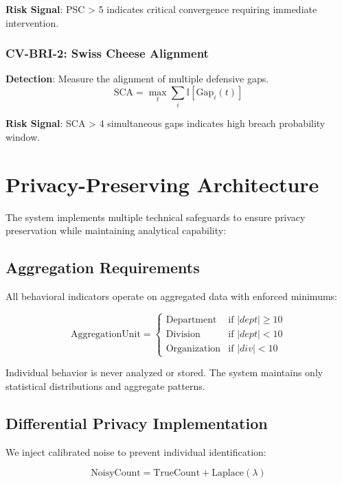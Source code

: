 \documentclass[11pt,a4paper]{article}
\begin{document}
\textbf{Risk Signal}: PSC > 5 indicates critical convergence requiring immediate intervention.

\subsubsection{CV-BRI-2: Swiss Cheese Alignment}
\textbf{Detection}: Measure the alignment of multiple defensive gaps.
\begin{equation}
\text{SCA} = \max_{t} \sum_{i} \mathbb{I}[\text{Gap}_i(t)]
\end{equation}

\textbf{Risk Signal}: SCA > 4 simultaneous gaps indicates high breach probability window.

\section{Privacy-Preserving Architecture}

The system implements multiple technical safeguards to ensure privacy preservation while maintaining analytical capability:

\subsection{Aggregation Requirements}

All behavioral indicators operate on aggregated data with enforced minimums:

\begin{equation}
\text{AggregationUnit} = \begin{cases}
\text{Department} & \text{if } |dept| \geq 10 \\
\text{Division} & \text{if } |dept| < 10 \\
\text{Organization} & \text{if } |div| < 10
\end{cases}
\end{equation}

Individual behavior is never analyzed or stored. The system maintains only statistical distributions and aggregate patterns.

\subsection{Differential Privacy Implementation}

We inject calibrated noise to prevent individual identification:

\begin{equation}
\text{NoisyCount} = \text{TrueCount} + \text{Laplace}(\lambda)
\end{equation}
\end{document}

